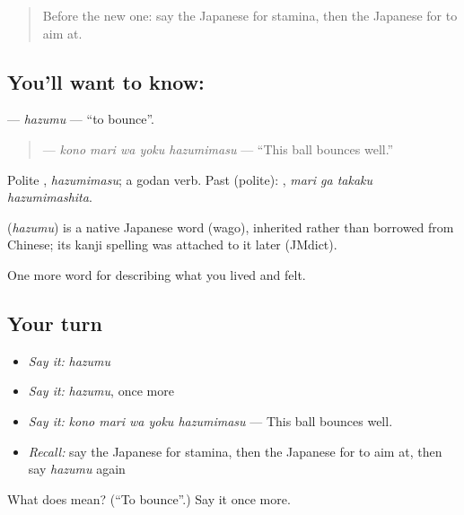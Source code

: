 \begin{quote}
Before the new one: say the Japanese for stamina, then the Japanese for to aim at.
\end{quote}

\subsection*{You'll want to know: }
\textbf{} — \emph{hazumu} — \textquotedblleft{}to bounce\textquotedblright{}.

\begin{quote}
\textbf{   } — \emph{kono mari wa yoku hazumimasu} — \textquotedblleft{}This ball bounces well.\textquotedblright{}
\end{quote}

Polite \textbf{}, \emph{hazumimasu}; a godan verb. Past (polite): \textbf{  }, \emph{mari ga takaku hazumimashita}.

\begin{cousinweb}
\textbf{} (\emph{hazumu}) is a native Japanese word (wago), inherited rather than borrowed from Chinese; its kanji spelling was attached to it later (JMdict).
\end{cousinweb}

\begin{grammarlens}[title={What you've built}]
One more word for describing what you lived and felt.
\end{grammarlens}

\subsection*{Your turn}
\begin{itemize}
\raggedright
  \item \emph{Say it:} \emph{hazumu}
  \item \emph{Say it:} \emph{hazumu}, once more
  \item \emph{Say it:} \emph{kono mari wa yoku hazumimasu} — This ball bounces well.
  \item \emph{Recall:} say the Japanese for stamina, then the Japanese for to aim at, then say \emph{hazumu} again
\end{itemize}

\begin{tcolorbox}[breakable,colback=teal!4,colframe=teal!35!black,title={Before you move on}]
What does  mean? (\textquotedblleft{}To bounce\textquotedblright{}.) Say it once more.
\end{tcolorbox}
